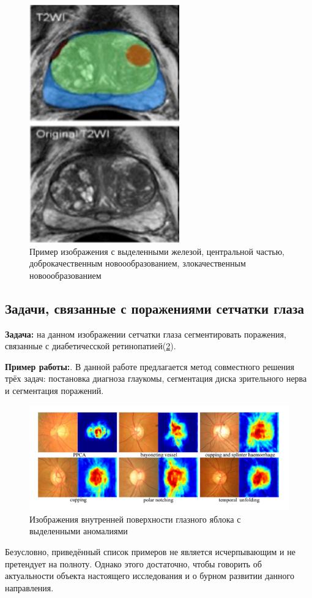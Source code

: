 \begin{figure}[h] 
  \center
  \includegraphics [scale=0.8] {images/prostate.png}
  \caption{ Пример изображения с выделенными {\color{blue} железой}, {\color{green} центральной частью}, {\color{orange} доброкачественным новоообразованием}, {\color{red} злокачественным новоообразованием} \cite{prostate-cancer} } 
  \label{fig:prostate}  
\end{figure}



\subsection{Задачи, связанные с поражениями сетчатки глаза}

{\bf Задача:} на данном изображении сетчатки глаза сегментировать поражения, связанные с диабетичесской ретинопатией(\ref{fig:retina}).

{\bf Пример работы:}\cite{retinopathy}. В данной работе предлагается метод совместного решения трёх задач: постановка диагноза глаукомы, сегментация диска зрительного нерва и сегментация поражений.

\begin{figure}[h] 
  \center
  \includegraphics [scale=0.8] {images/glaucoma.png}
  \caption{ Изображения внутренней поверхности глазного яблока с выделенными аномалиями} 
  \label{fig:retina}  
\end{figure}


Безусловно, приведённый список примеров не является исчерпывающим и не претендует на полноту. Однако этого достаточно, чтобы говорить об актуальности объекта настоящего исследования и о бурном развитии данного направления.

